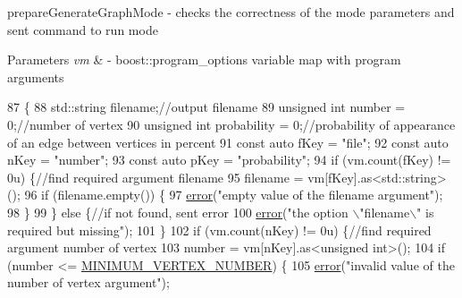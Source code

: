 prepare\+Generate\+Graph\+Mode -\/ checks the correctness of the mode parameters and sent command to run mode 


\begin{DoxyParams}{Parameters}
{\em vm} & -\/ boost\+::program\+\_\+options variable map with program arguments \\
\hline
\end{DoxyParams}

\begin{DoxyCode}
87                                                                                \{
88             std::string filename;\textcolor{comment}{//output filename}
89             \textcolor{keywordtype}{unsigned} \textcolor{keywordtype}{int} number = 0;\textcolor{comment}{//number of vertex}
90             \textcolor{keywordtype}{unsigned} \textcolor{keywordtype}{int} probability = 0;\textcolor{comment}{//probability of appearance of an edge between vertices in percent}
91             \textcolor{keyword}{const} \textcolor{keyword}{auto} fKey = \textcolor{stringliteral}{"file"};
92             \textcolor{keyword}{const} \textcolor{keyword}{auto} nKey = \textcolor{stringliteral}{"number"};
93             \textcolor{keyword}{const} \textcolor{keyword}{auto} pKey = \textcolor{stringliteral}{"probability"};
94             \textcolor{keywordflow}{if} (vm.count(fKey) != 0u) \{\textcolor{comment}{//find required argument filename}
95                 filename = vm[fKey].as<std::string>();
96                 \textcolor{keywordflow}{if} (filename.empty()) \{
97                     \hyperlink{a00002_a87a2f3f5782023b4ed03aedc00094c01_a87a2f3f5782023b4ed03aedc00094c01}{error}(\textcolor{stringliteral}{"empty value of the filename argument"});
98                 \}
99             \} \textcolor{keywordflow}{else} \{\textcolor{comment}{//if not found, sent error}
100                 \hyperlink{a00002_a87a2f3f5782023b4ed03aedc00094c01_a87a2f3f5782023b4ed03aedc00094c01}{error}(\textcolor{stringliteral}{"the option \(\backslash\)"filename\(\backslash\)" is required but missing"});
101             \}
102             \textcolor{keywordflow}{if} (vm.count(nKey) != 0u) \{\textcolor{comment}{//find required argument number of vertex}
103                 number = vm[nKey].as<\textcolor{keywordtype}{unsigned} \textcolor{keywordtype}{int}>();
104                 \textcolor{keywordflow}{if} (number <= \hyperlink{a00002_a25b69ee820b15148121a85e344f6d26a_a25b69ee820b15148121a85e344f6d26a}{MINIMUM\_VERTEX\_NUMBER}) \{
105                     \hyperlink{a00002_a87a2f3f5782023b4ed03aedc00094c01_a87a2f3f5782023b4ed03aedc00094c01}{error}(\textcolor{stringliteral}{"invalid value of the number of vertex argument"});

\end{DoxyCode}
